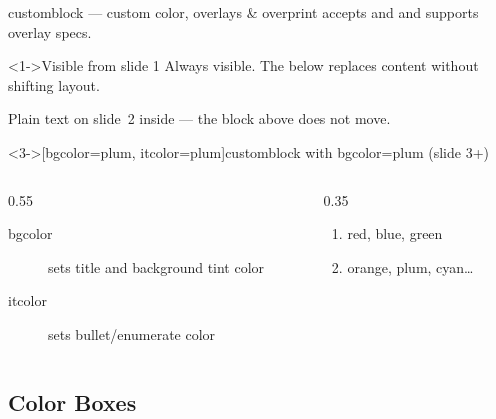 \documentclass[presentation, aspectratio=169]{beamer}
\begin{document}
\begin{frame}{customblock --- custom color, overlays \& overprint}
   accepts  and  and supports overlay specs.

  \begin{block}<1->{Visible from slide 1}
    Always visible. The  below replaces content without shifting layout.
  \end{block}

  \begin{overprint}
    \vspace{0.3em}
    Plain text on slide~2 inside  --- the block above does not move.

    \begin{customblock}<3->[bgcolor=plum, itcolor=plum]{customblock with bgcolor=plum (slide 3+)}
      \begin{columns}
        \begin{column}{0.55\columnwidth}
          \begin{description}
            \item[bgcolor] sets title and background tint color
            \item[itcolor] sets bullet/enumerate color
          \end{description}
        \end{column}
        \begin{column}{0.35\columnwidth}
          \begin{enumerate}
            \item red, blue, green
            \item orange, plum, cyan\ldots
          \end{enumerate}
        \end{column}
      \end{columns}
    \end{customblock}
  \end{overprint}
\end{frame}

\subsection{Color Boxes}
\end{document}
